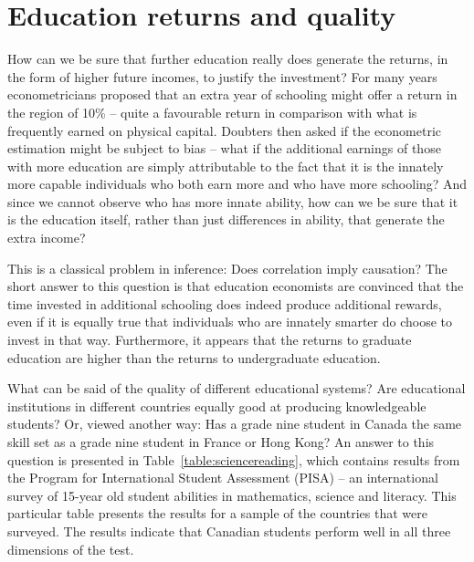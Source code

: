\section{Education returns and quality}\label{sec:ch13sec5}

How can we be sure that further education really does generate the returns,
in the form of higher future incomes, to justify the investment? For many
years econometricians proposed that an extra year of schooling might offer a
return in the region of 10\% -- quite a favourable return in comparison with
what is frequently earned on physical capital. Doubters then asked if the
econometric estimation might be subject to bias -- what if the additional
earnings of those with more education are simply attributable to the fact
that it is the innately more capable individuals who both earn more and who
have more schooling? And since we cannot observe who has more innate
ability, how can we be sure that it is the education itself, rather than
just differences in ability, that generate the extra income?

This is a classical problem in inference: Does correlation imply causation?
The short answer to this question is that education economists are convinced
that the time invested in additional schooling does indeed produce
additional rewards, even if it is equally true that individuals who are
innately smarter do choose to invest in that way. Furthermore, it appears
that the returns to graduate education are higher than the returns to
undergraduate education.


What can be said of the quality of different educational systems? Are
educational institutions in different countries equally good at producing
knowledgeable students? Or, viewed another way: Has a grade nine student in
Canada the same skill set as a grade nine student in France or Hong Kong? An
answer to this question is presented in Table~\ref{table:sciencereading},
which contains results from the Program for International Student Assessment
(PISA) -- an international survey of 15-year old student abilities in
mathematics, science and literacy. This particular table presents the
results for a sample of the countries that were surveyed. The results
indicate that Canadian students perform well in all three dimensions of the
test. 


